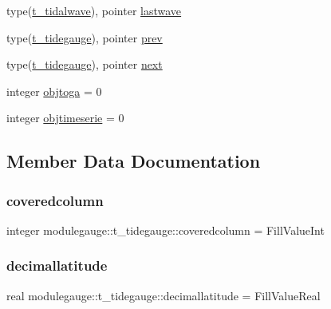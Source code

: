 \begin{DoxyCompactItemize}
\item 
type(\mbox{\hyperlink{structmodulegauge_1_1t__tidalwave}{t\+\_\+tidalwave}}), pointer \mbox{\hyperlink{structmodulegauge_1_1t__tidegauge_aea647e229923405045fe26bacab2f09c}{lastwave}}
\item 
type(\mbox{\hyperlink{structmodulegauge_1_1t__tidegauge}{t\+\_\+tidegauge}}), pointer \mbox{\hyperlink{structmodulegauge_1_1t__tidegauge_a9132f93c47b6a5e924edf9a909811a3b}{prev}}
\item 
type(\mbox{\hyperlink{structmodulegauge_1_1t__tidegauge}{t\+\_\+tidegauge}}), pointer \mbox{\hyperlink{structmodulegauge_1_1t__tidegauge_a89527ac4aed16bd1ba4c9b9c1dd03f81}{next}}
\item 
integer \mbox{\hyperlink{structmodulegauge_1_1t__tidegauge_a502329557be6793daa6c0848e6597e51}{objtoga}} = 0
\item 
integer \mbox{\hyperlink{structmodulegauge_1_1t__tidegauge_ad960ff0e29543110c595c5a880f5e09a}{objtimeserie}} = 0
\end{DoxyCompactItemize}


\subsection{Member Data Documentation}
\mbox{\label{structmodulegauge_1_1t__tidegauge_a282d24e61c67dece355550e68e071ed2}} 
\subsubsection{\texorpdfstring{coveredcolumn}{coveredcolumn}}
{\footnotesize\ttfamily integer modulegauge\+::t\+\_\+tidegauge\+::coveredcolumn = Fill\+Value\+Int\hspace{0.3cm}{\ttfamily [private]}}

\mbox{\label{structmodulegauge_1_1t__tidegauge_a45c10f24b11c67530b40c12d6e027388}} 
\subsubsection{\texorpdfstring{decimallatitude}{decimallatitude}}
{\footnotesize\ttfamily real modulegauge\+::t\+\_\+tidegauge\+::decimallatitude = Fill\+Value\+Real\hspace{0.3cm}{\ttfamily [private]}}


